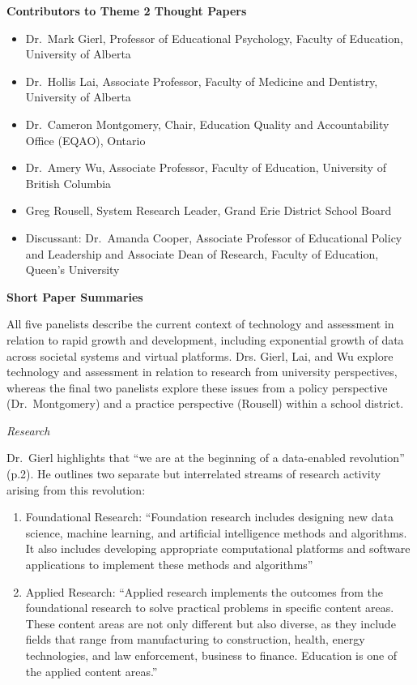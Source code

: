 \documentclass[
]{book}
\begin{document}
\textbf{Contributors to Theme 2 Thought Papers}

\begin{itemize}
\item
  Dr.~Mark Gierl, Professor of Educational Psychology, Faculty of Education, University of Alberta
\item
  Dr.~Hollis Lai, Associate Professor, Faculty of Medicine and Dentistry, University of Alberta
\item
  Dr.~Cameron Montgomery, Chair, Education Quality and Accountability Office (EQAO), Ontario
\item
  Dr.~Amery Wu, Associate Professor, Faculty of Education, University of British Columbia
\item
  Greg Rousell, System Research Leader, Grand Erie District School Board
\item
  Discussant: Dr.~Amanda Cooper, Associate Professor of Educational Policy and Leadership and Associate Dean of Research, Faculty of Education, Queen's University
\end{itemize}

\textbf{Short Paper Summaries}

All five panelists describe the current context of technology and assessment in relation to rapid growth and development, including exponential growth of data across societal systems and virtual platforms. Drs. Gierl, Lai, and Wu explore technology and assessment in relation to research from university perspectives, whereas the final two panelists explore these issues from a policy perspective (Dr.~Montgomery) and a practice perspective (Rousell) within a school district.

\emph{Research}

Dr.~Gierl highlights that ``we are at the beginning of a data-enabled revolution'' (p.2). He outlines two separate but interrelated streams of research activity arising from this revolution:

\begin{enumerate}
\def\labelenumi{\arabic{enumi}.}
\item
  Foundational Research: ``Foundation research includes designing new data science, machine learning, and artificial intelligence methods and algorithms. It also includes developing appropriate computational platforms and software applications to implement these methods and algorithms''
\item
  Applied Research: ``Applied research implements the outcomes from the foundational research to solve practical problems in specific content areas. These content areas are not only different but also diverse, as they include fields that range from manufacturing to construction, health, energy technologies, and law enforcement, business to finance. Education is one of the applied content areas.''
\end{enumerate}
\end{document}
